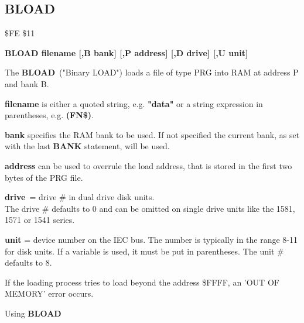 
\newpage
\subsection{BLOAD}
\begin{description}[leftmargin=3cm,style=nextline]
\item [Token:] \$FE \$11
\item [Format:] {\bf BLOAD filename [,B bank]
                [,P address]  [,D drive] [,U unit] }
\item [Usage:]
   The {\bf BLOAD} ("Binary LOAD") loads a file of type
   PRG into RAM at address P and bank B.

   {\bf filename} is either a quoted string, e.g. {\bf "data"} or
   a string expression in parentheses, e.g. {\bf (FN\$)}.

   {\bf bank} specifies the RAM bank to be used.
   If not specified the current bank, as set with the last
   {\bf BANK} statement, will be used.

   {\bf address} can be used to overrule the load address,
   that is stored in the first two bytes of the PRG file.

   {\bf drive} = drive \# in dual drive disk units. \\
   The drive \# defaults to 0 and can be omitted on single drive units
   like the 1581, 1571 or 1541 series.

   {\bf unit} = device number on the IEC bus.
   The number is typically in the range 8-11 for disk units.
   If a variable is used, it must be put in parentheses.
   The unit \# defaults to 8.

\item [Remarks:]
   If the loading process tries to load beyond the address \$FFFF,
   an 'OUT OF MEMORY' error occurs.

\item [Example:] Using {\bf BLOAD}
\end{description}


\newpage
